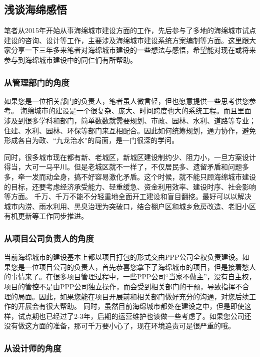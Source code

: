 \documentclass[]{book}
\begin{document}
\subsection{浅谈海绵感悟}

笔者从2015年开始从事海绵城市建设方面的工作，先后参与了多地的海绵城市试点建设的咨询、设计等工作，主要涉及海绵城市建设系统方案编制等方面。这里跟大家分享一下三年多来笔者对海绵城市建设的一些想法与感悟，希望能对现在或将来参与到海绵城市建设中的同仁们有所帮助。

\subsubsection{从管理部门的角度}

如果您是一位相关部门的负责人，笔者虽人微言轻，但也愿意提供一些思考供您参考。
海绵城市的建设是一个很复杂、庞大、时间跨度也大的系统工程。而且里面涉及到很多学科和部门，简单数数就需要规划、市政、园林、水利、道路等专业；住建、水利、园林、环保等部门来互相配合。因此如何统筹规划，通力协作，避免形成各自为政、``九龙治水''的局面，是一门很深的学问。

同时，很多城市现在都有新、老城区，新城区建设制约少、阻力小，一旦方案设计得当，大可一马平川。但是老城区就不一样了，不仅居民多、遗留矛盾和问题多多，牵一发而动全身，搞不好容易激化矛盾。这个时候，就不能只顾海绵城市建设的目标，还要考虑经济承受能力、轻重缓急、资金利用效率、建设时序、社会影响等方面。
千万、千万不能不分轻重地全面开工建设和盲目翻挖。最好可以以解决城市内涝、雨水利用、黑臭治理为突破口，结合棚户区和城乡危房改造、老旧小区有机更新等工作同步推进。

\subsubsection{从项目公司负责人的角度}

当前海绵城市的建设基本上都以项目打包的形式交由PPP公司全权负责建设。如果您是一位项目公司的负责人，首先恭喜您拿下了海绵城市的项目，但是接着愁人的事情来了。在很多项目管理过程中，一些PPP公司``当家不做主''，没有自主权，项目的管控不是由PPP公司独立操作，而会受到相关部门的干预，导致指挥不合理的局面。因此，如果您能在项目开展前和相关部门做好充分的沟通，对您后续工作的开展会有很大帮助。
同时，虽然目前海绵城市都处在建设之中，但是即使这样，试点期也已经过了2-3年，后期的运营维护也该做一些考虑了。如果您公司还没有做这方面的准备，那可千万要小心了，现在环境追责可是很严重的哦。

\subsubsection{从设计师的角度}
\end{document}

